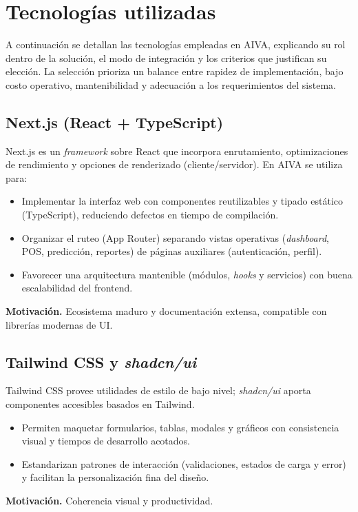 \section{Tecnologías utilizadas}\label{sec:tecnologias}
A continuación se detallan las tecnologías empleadas en AIVA, explicando su rol dentro de la solución, el modo de integración y los criterios que justifican su elección. La selección prioriza un balance entre rapidez de implementación, bajo costo operativo, mantenibilidad y adecuación a los requerimientos del sistema.

\subsection{Next.js (React + TypeScript)}
Next.js es un \textit{framework} sobre React que incorpora enrutamiento, optimizaciones de rendimiento y opciones de renderizado (cliente/servidor). En AIVA se utiliza para:
\begin{itemize}
    \item Implementar la interfaz web con componentes reutilizables y tipado estático (TypeScript), reduciendo defectos en tiempo de compilación.
    \item Organizar el ruteo (App Router) separando vistas operativas (\textit{dashboard}, POS, predicción, reportes) de páginas auxiliares (autenticación, perfil).
    \item Favorecer una arquitectura mantenible (módulos, \textit{hooks} y servicios) con buena escalabilidad del frontend.
\end{itemize}
\noindent\textbf{Motivación.} Ecosistema maduro y documentación extensa, compatible con librerías modernas de UI.

\subsection{Tailwind CSS y \textit{shadcn/ui}}
Tailwind CSS provee utilidades de estilo de bajo nivel; \textit{shadcn/ui} aporta componentes accesibles basados en Tailwind.
\begin{itemize}
    \item Permiten maquetar formularios, tablas, modales y gráficos con consistencia visual y tiempos de desarrollo acotados.
    \item Estandarizan patrones de interacción (validaciones, estados de carga y error) y facilitan la personalización fina del diseño.
\end{itemize}
\noindent\textbf{Motivación.} Coherencia visual y productividad. 

